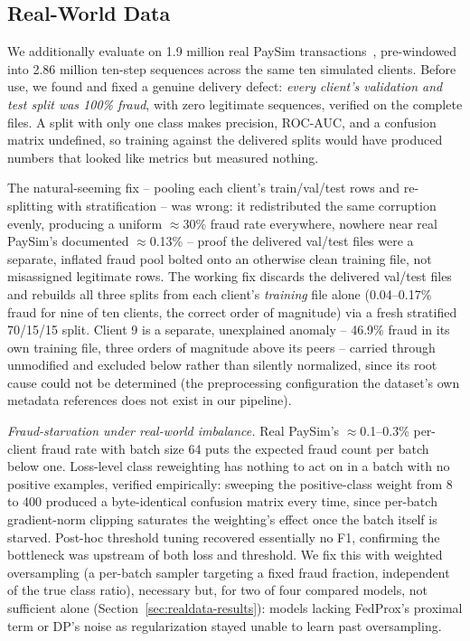 \documentclass[12pt]{svproc}
\begin{document}
\subsection{Real-World Data}
\label{sec:realdata}
We additionally evaluate on 1.9 million real PaySim
transactions~\cite{lopezrojas2016paysim}, pre-windowed into 2.86 million
ten-step sequences across the same ten simulated clients. Before use,
we found and fixed a genuine delivery defect: \emph{every client's
validation and test split was 100\% fraud}, with zero legitimate
sequences, verified on the complete files. A split with only one class
makes precision, ROC-AUC, and a confusion matrix undefined, so training
against the delivered splits would have produced numbers that looked
like metrics but measured nothing.

The natural-seeming fix -- pooling each client's train/val/test rows
and re-splitting with stratification -- was wrong: it redistributed the
same corruption evenly, producing a uniform $\approx$30\% fraud rate
everywhere, nowhere near real PaySim's documented $\approx$0.13\% --
proof the delivered val/test files were a separate, inflated fraud
pool bolted onto an otherwise clean training file, not misassigned
legitimate rows. The working fix discards the delivered val/test files
and rebuilds all three splits from each client's \emph{training} file
alone (0.04--0.17\% fraud for nine of ten clients, the correct order of
magnitude) via a fresh stratified 70/15/15 split. Client 9 is a
separate, unexplained anomaly -- 46.9\% fraud in its own training file,
three orders of magnitude above its peers -- carried through unmodified
and excluded below rather than silently normalized, since its root
cause could not be determined (the preprocessing configuration the
dataset's own metadata references does not exist in our pipeline).

\emph{Fraud-starvation under real-world imbalance.} Real PaySim's
$\approx$0.1--0.3\% per-client fraud rate with batch size 64 puts the
expected fraud count per batch below one. Loss-level class reweighting
has nothing to act on in a batch with no positive examples, verified
empirically: sweeping the positive-class weight from 8 to 400 produced
a byte-identical confusion matrix every time, since per-batch
gradient-norm clipping saturates the weighting's effect once the batch
itself is starved. Post-hoc threshold tuning recovered essentially no
F1, confirming the bottleneck was upstream of both loss and threshold.
We fix this with weighted oversampling (a per-batch sampler targeting a
fixed fraud fraction, independent of the true class ratio), necessary
but, for two of four compared models, not sufficient alone
(Section~\ref{sec:realdata-results}): models lacking FedProx's
proximal term or DP's noise as regularization stayed unable to learn
past oversampling.
\end{document}
